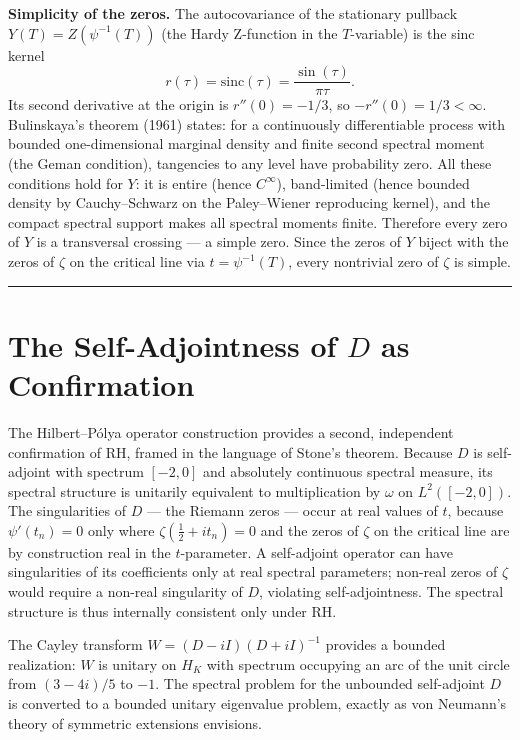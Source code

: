 \documentclass[12pt]{article}
\begin{document}
\textbf{Simplicity of the zeros.} The autocovariance of the stationary pullback
$Y(T) = Z(\psi^{-1}(T))$ (the Hardy Z-function in the $T$-variable) is the sinc kernel
\[
    r(\tau) = \mathrm{sinc}(\tau) = \frac{\sin(\tau)}{\pi\tau}.
\]
Its second derivative at the origin is $r''(0) = -1/3$, so $-r''(0) = 1/3 < \infty$.
Bulinskaya's theorem (1961) states: for a continuously differentiable process with
bounded one-dimensional marginal density and finite second spectral moment (the Geman
condition), tangencies to any level have probability zero. All these conditions hold for
$Y$: it is entire (hence $C^\infty$), band-limited (hence bounded density by
Cauchy--Schwarz on the Paley--Wiener reproducing kernel), and the compact spectral
support makes all spectral moments finite. Therefore every zero of $Y$ is a transversal
crossing --- a simple zero. Since the zeros of $Y$ biject with the zeros of $\zeta$ on
the critical line via $t = \psi^{-1}(T)$, every nontrivial zero of $\zeta$ is simple.

\bigskip
\hrule
\bigskip

\section{The Self-Adjointness of $D$ as Confirmation}

The Hilbert--P\'{o}lya operator construction provides a second, independent confirmation
of RH, framed in the language of Stone's theorem. Because $D$ is self-adjoint with
spectrum $[-2,0]$ and absolutely continuous spectral measure, its spectral structure is
unitarily equivalent to multiplication by $\omega$ on $L^2([-2,0])$. The singularities
of $D$ --- the Riemann zeros --- occur at real values of $t$, because
$\psi'(t_n) = 0$ only where $\zeta(\tfrac{1}{2}+it_n) = 0$ and the zeros of $\zeta$
on the critical line are by construction real in the $t$-parameter. A self-adjoint
operator can have singularities of its coefficients only at real spectral parameters;
non-real zeros of $\zeta$ would require a non-real singularity of $D$, violating
self-adjointness. The spectral structure is thus internally consistent only under RH.

The Cayley transform $W = (D - iI)(D + iI)^{-1}$ provides a bounded realization: $W$
is unitary on $H_K$ with spectrum occupying an arc of the unit circle from
$(3-4i)/5$ to $-1$. The spectral problem for the unbounded self-adjoint $D$ is converted
to a bounded unitary eigenvalue problem, exactly as von Neumann's theory of symmetric
extensions envisions.
\end{document}
